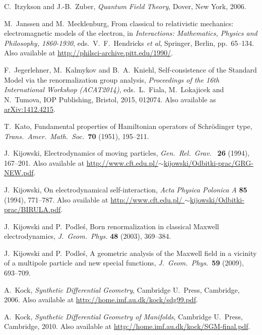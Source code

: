 \documentclass{article}
\begin{document}
\begin{thebibliography}{10}
 C.\ Itzykson and J.-B.\ Zuber, \textsl{Quantum Field Theory}, Dover, New York, 2006.

 M.\ Janssen and M.\ Mecklenburg, From classical to relativistic mechanics: electromagnetic models of the electron, in \textsl{Interactions: Mathematics, Physics and Philosophy, 1860-1930}, eds.\ V.\ F.\ Hendricks \textit{et al}, Springer, Berlin, pp.\ 65--134.  Also available at \href{http://philsci-archive.pitt.edu/1990/}{http://philsci-archive.pitt.edu/1990/}.

 F.\ Jegerlehner, M.\ Kalmykov and B.\ A.\ Kniehl, Self-consistence of the Standard Model via the renormalization group analysis, \textsl{Proceedings of the 16th International Workshop (ACAT2014)}, eds.\ L.\ Fiala, M.\ Lokajicek and N.\ Tumova, IOP Publishing, Bristol, 2015, 012074. Also available as \href{http://arxiv.org/abs/1412.4215}{arXiv:1412.4215}.

 T.\ Kato, Fundamental properties of Hamiltonian operators of Schr\"odinger type, \textit{Trans.\ Amer.\ Math.\ Soc.\ }{\bf 70} (1951), 195--211.

 J.\ Kijowski, Electrodynamics of moving particles, 
\textsl{Gen.\ Rel.\ Grav.\ } \textbf{26} (1994), 167--201.  Also available at
\href{http://www.cft.edu.pl/~kijowski/Odbitki-prac/GRG-NEW.pdf}
{http://www.cft.edu.pl/\break $\sim$kijowski/Odbitki-prac/GRG-NEW.pdf}.

 J.\ Kijowski, On electrodynamical self-interaction, 
\textsl{Acta Physica Polonica A} \textbf{85} (1994), 771--787.
Also available at \href{http://www.cft.edu.pl/~kijowski/Odbitki-prac/BIRULA.pdf}
{http://www.cft.edu.pl/ \break $\sim$kijowski/Odbitki-prac/BIRULA.pdf}.

 J.\ Kijowski and P.\ Podle\'s, Born renormalization in classical Maxwell electrodynamics, \textsl{J.\ Geom.\ Phys.} \textbf{48} (2003), 369--384.

 J.\ Kijowski and P.\ Podle\'s, A geometric analysis of the Maxwell field in a vicinity of a multipole particle and new special functions, \textsl{J.\ Geom.\ Phys.\ }\textbf{59} (2009), 693--709.
 
 A.\ Kock, \textsl{Synthetic Differential Geometry}, 
Cambridge U.\ Press, Cambridge, 2006.  Also available at 
\href{http://home.imf.au.dk/kock/sdg99.pdf}{http://home.imf.au.dk/kock/sdg99.pdf}.

 A.\ Kock, \textsl{Synthetic Differential Geometry of Manifolds},
Cambridge U.\ Press, Cambridge, 2010.  Also available at 
\href{http://home.imf.au.dk/kock/SGM-final.pdf}{http://home.imf.au.dk/kock/SGM-final.pdf}.


\end{thebibliography}
\end{document}
